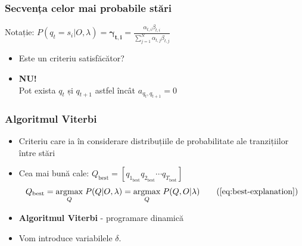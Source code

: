 \begin{frame}
  \frametitle{Secvența celor mai probabile stări}
  Notație: $P(q_t = s_i \vert O, \lambda) = \mathbf{\gamma_{t,i}} = 
  \frac{\alpha_{t,i}\beta_{t,i}}{\displaystyle\sum_{j=1}^{N}\alpha_{t,j}\beta_{t,j}}$
  \begin{itemize}
  \item Este un criteriu satisfăcător?\pause
  \item \textbf{NU!}\\Pot exista $q_t$ și $q_{t+1}$ astfel încât $a_{q_t,q_{t+1}}=0$
  \end{itemize}

\end{frame}

\begin{frame}
  \frametitle{Algoritmul Viterbi}
  \begin{itemize}
  \item Criteriu care ia în considerare distribuțiile de probabilitate 
    ale tranzițiilor între stări
  \item Cea mai bună cale:
    $Q_{\text{best}} = [q_{1_{\text{best}}} q_{2_{\text{best}}} \cdots q_{T_{\text{best}}}]$
    \begin{equation}
      Q_{\text{best}} = \underset{Q}{\operatorname{argmax}}\;
      P(Q \vert O, \lambda)
      = \underset{Q}{\operatorname{argmax}}\; P(Q, O \vert \lambda)
      \tag{\ref{eq:best-explanation}}
    \end{equation}
  \item \textbf{Algoritmul Viterbi} - programare dinamică
  \item Vom introduce variabilele $\delta$.
  \end{itemize}
\end{frame}

